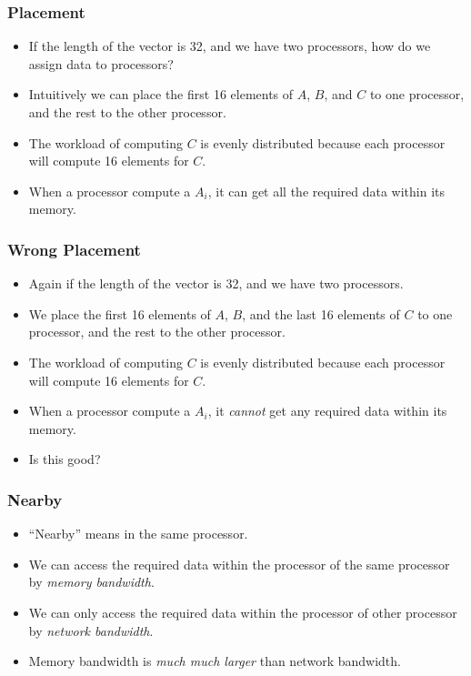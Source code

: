 \documentclass{beamer}
\begin{document}
\begin{CJK}{UTF8}{bsmi}
\begin{frame}
\frametitle{Placement}
\begin{itemize}
\item If the length of the vector is 32, and we have two processors,
  how do we assign data to processors?
\item Intuitively we can place the first 16 elements of $A$, $B$, and
  $C$ to one processor, and the rest to the other processor.
\item The workload of computing $C$ is evenly distributed because each
  processor will compute 16 elements for $C$.
\item When a processor compute a $A_i$, it can get all the required
  data within its memory.
\end{itemize}
\end{frame}

\begin{frame}
\frametitle{Wrong Placement}
\begin{itemize}
\item Again if the length of the vector is 32, and we have two
  processors.
\item We place the first 16 elements of $A$, $B$, and the last 16
  elements of $C$ to one processor, and the rest to the other
  processor.
\item The workload of computing $C$ is evenly distributed because each
  processor will compute 16 elements for $C$.
\item When a processor compute a $A_i$, it {\em cannot} get any
  required data within its memory.
\item Is this good?
\end{itemize}
\end{frame}

\begin{frame}
\frametitle{Nearby}
\begin{itemize}
\item ``Nearby'' means in the same processor.
\item We can access the required data within the processor of the same
  processor by {\em memory bandwidth}.
\item We can only access the required data within the processor of
  other processor by {\em network bandwidth}.
\item Memory bandwidth is {\em much much larger} than network
  bandwidth.
\end{itemize}
\end{frame}


\end{CJK}
\end{document}
